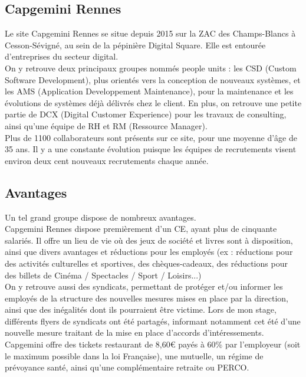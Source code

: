 \documentclass{rapport}
\begin{document}
\subsection{Capgemini Rennes}

Le site Capgemini Rennes se situe depuis 2015 sur la ZAC des Champs-Blancs à Cesson-Sévigné, au sein de la pépinière Digital Square. Elle est entourée d'entreprises du secteur digital. \\

On y retrouve deux principaux groupes nommés people units : les CSD (Custom Software Development), plus orientés vers la conception de nouveaux systèmes, et les AMS (Application Developpement Maintenance), pour la maintenance et les évolutions de systèmes déjà délivrés chez le client. En plus, on retrouve une petite partie de DCX (Digital Customer Experience) pour les travaux de consulting, ainsi qu'une équipe de RH et RM (Ressource Manager).\\

Plus de 1100 collaborateurs sont présents sur ce site, pour une moyenne d'âge de 35 ans. Il y a une constante évolution puisque les équipes de recrutements visent environ deux cent nouveaux recrutements chaque année. 

\subsection{Avantages}
Un tel grand groupe dispose de nombreux avantages.\\
Capgemini Rennes dispose premièrement d'un CE, ayant plus de cinquante salariés. Il offre un lieu de vie où des jeux de société et livres sont à disposition, ainsi que divers avantages et réductions pour les employés (ex : réductions pour des activités culturelles et sportives, des chèques-cadeaux, des réductions pour des billets de Cinéma / Spectacles / Sport / Loisirs...)\\

On y retrouve aussi des syndicats, permettant de protéger et/ou informer les employés de la structure des nouvelles mesures mises en place par la direction, ainsi que des inégalités dont ils pourraient être victime. Lors de mon stage,  différents flyers de syndicats ont été partagés, informant notamment cet été d'une nouvelle mesure traitant de la mise en place d'accords d'intéressements.\\

Capgemini offre des tickets restaurant de 8,60€ payés à 60\% par l'employeur (soit le maximum possible dans la loi Française), une mutuelle, un régime de prévoyance santé, ainsi qu'une complémentaire retraite ou PERCO.\\
\end{document}

